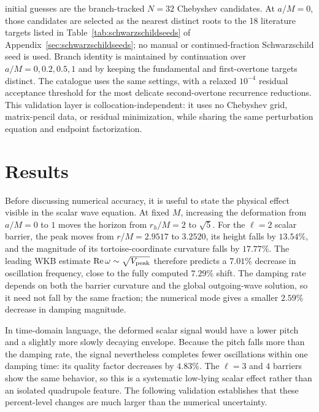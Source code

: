 \documentclass[12pt,a4paper]{article}
\begin{document}
initial guesses are the branch-tracked \(N=32\) Chebyshev candidates. At
\(a/M=0\), those candidates are selected as the nearest distinct roots to the
18 literature targets listed in Table~\ref{tab:schwarzschildseeds} of
Appendix~\ref{sec:schwarzschildseeds}; no
manual or continued-fraction Schwarzschild seed is used. Branch
identity is maintained by continuation over \(a/M=0,0.2,0.5,1\) and by keeping
the fundamental and first-overtone targets distinct.  The catalogue uses the
same settings, with a relaxed \(10^{-4}\) residual acceptance threshold for the
most delicate second-overtone recurrence reductions. This validation layer is
collocation-independent: it uses no Chebyshev grid, matrix-pencil data, or residual
minimization, while sharing the same perturbation equation and endpoint
factorization.
\color{black}

\section{Results}

\color{blue}
Before discussing numerical accuracy, it is useful to state the physical
effect visible in the scalar wave equation.  At fixed \(M\), increasing the
deformation from \(a/M=0\) to \(1\) moves the horizon from \(r_h/M=2\) to
\(\sqrt{5}\).  For the \(\ell=2\) scalar barrier, the peak moves from
\(r/M=2.9517\) to \(3.2520\), its height falls by \(13.54\%\), and the
magnitude of its tortoise-coordinate curvature falls by \(17.77\%\).  The
leading WKB estimate \(\operatorname{Re}\omega\sim\sqrt{V_{\rm peak}}\)
therefore predicts a \(7.01\%\) decrease in oscillation frequency, close to
the fully computed \(7.29\%\) shift.  The damping rate depends on both the
barrier curvature and the global outgoing-wave solution, so it need not fall
by the same fraction; the numerical mode gives a smaller \(2.59\%\) decrease
in damping magnitude.

In time-domain language, the deformed scalar signal would have a lower pitch
and a slightly more slowly decaying envelope.  Because the pitch falls more
than the damping rate, the signal nevertheless completes fewer oscillations
within one damping time: its quality factor decreases by \(4.83\%\).  The
\(\ell=3\) and \(4\) barriers show the same behavior, so this is a systematic
low-lying scalar effect rather than an isolated quadrupole feature.  The
following validation establishes that these percent-level changes are much
larger than the numerical uncertainty.

\color{black}
\end{document}
